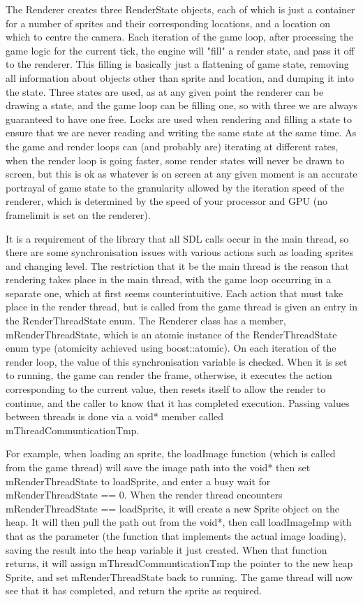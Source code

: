     The Renderer creates three RenderState objects, each of which is just a container for a number of sprites and their corresponding locations, and a location on which to centre the camera.
    Each iteration of the game loop, after processing the game logic for the current tick, the engine will "fill" a render state, and pass it off to the renderer. This filling is basically just a flattening of game state, removing all information about objects other than sprite and location, and dumping it into the state.
    Three states are used, as at any given point the renderer can be drawing a state, and the game loop can be filling one, so with three we are always guaranteed to have one free.
    Locks are used when rendering and filling a state to ensure that we are never reading and writing the same state at the same time.
    As the game and render loops can (and probably are) iterating at different rates, when the render loop is going faster, some render states will never be drawn to screen, but this is ok as whatever is on screen at any given moment is an accurate portrayal of game state to the granularity allowed by the iteration speed of the renderer, which is determined by the speed of your processor and GPU (no framelimit is set on the renderer).
    
    \mbox{}
    
    It is a requirement of the library that all SDL calls occur in the main thread, so there are some synchronisation issues with various actions such as loading sprites and changing level. The restriction that it be the main thread is the reason that rendering takes place in the main thread, with the game loop occurring in a separate one, which at first seems counterintuitive.
    Each action that must take place in the render thread, but is called from the game thread is given an entry in the RenderThreadState enum. The Renderer class has a member, mRenderThreadState, which is an atomic instance of the RenderThreadState enum type (atomicity achieved using boost::atomic). On each iteration of the render loop, the value of this synchronisation variable is checked. When it is set to running, the game can render the frame, otherwise, it executes the action corresponding to the current value, then resets itself to allow the render to continue, and the caller to know that it has completed execution. Passing values between threads is done via a void* member called mThreadCommunticationTmp.
    
    For example, when loading an sprite, the loadImage function (which is called from the game thread) will save the image path into the void* then set mRenderThreadState to loadSprite, and enter a busy wait for mRenderThreadState == 0.
    When the render thread encounters mRenderThreadState == loadSprite, it will create a new Sprite object on the heap. It will then pull the path out from  the void*, then call loadImageImp with that as the parameter (the function that implements the actual image loading), saving the result into the heap variable it just created.
    When that function returns, it will assign mThreadCommunticationTmp the pointer to the new heap Sprite, and set mRenderThreadState back to running.
    The game thread will now see that it has completed, and return the sprite as required.
        
